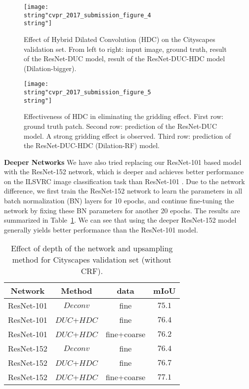 \documentclass[10pt,twocolumn,letterpaper]{article}
\begin{document}
\begin{figure*}[h]
\begin{center}
\texttt{[image: \\string"cvpr\_2017\_submission\_figure\_4\\string"]}
\end{center}
\caption{Effect of Hybrid Dilated Convolution (HDC) on the Cityscapes validation set. From left to right: input image, ground truth, result of the ResNet-DUC model, result of the ResNet-DUC-HDC model (Dilation-bigger).}
\label{cvpr_2017_submission_figure_4}
\vspace{-15pt}
\end{figure*}

\begin{figure}[h]
\begin{center}
\texttt{[image: \\string"cvpr\_2017\_submission\_figure\_5\\string"]}
\end{center}
\caption{Effectiveness of HDC in eliminating the gridding effect. First row: ground truth patch. Second row: prediction of the ResNet-DUC model. A strong gridding effect is observed. Third row: prediction of the ResNet-DUC-HDC (Dilation-RF) model.}
\label{Figure5_gridding_example_result}
\vspace{-10pt}
\end{figure}

\textbf{Deeper Networks}
We have also tried replacing our ResNet-101 based model with the ResNet-152 network, which is deeper and achieves better performance on the ILSVRC image classification task than ResNet-101 \cite{he2015deep}. Due to the network difference, we first train the ResNet-152 network to learn the parameters in all batch normalization (BN) layers for 10 epochs, and continue fine-tuning the network by fixing these BN parameters for another 20 epochs. The results are summarized in Table~\ref{table_3}. We can see that using the deeper ResNet-152 model generally yields better performance than the ResNet-101 model.
\begin{table}[ht]
\begin{center}
\begin{tabular}{ccc|c} \toprule[1.5pt]{Network}      &     {Method} & {data}  &{mIoU}\\ \midrule
   ResNet-101  &     $Deconv$  & {fine}  & $75.1$\\
   ResNet-101  &     $DUC$+$HDC$ & {fine}   & $76.4$\\
   ResNet-101  &     $DUC$+$HDC$  & {fine+coarse}  & $76.2$ \\\midrule
   ResNet-152  &     	 $Deconv$  & {fine}  & $76.4$ \\
   ResNet-152  &     	 $DUC$+$HDC$  & {fine}  & $76.7$\\
   ResNet-152  &     	 $DUC$+$HDC$  & {fine+coarse}  & $77.1$ \\
\bottomrule[1.5pt]
\end{tabular}
\vspace{2pt}
\caption{Effect of depth of the network and upsampling method for Cityscapes validation set (without CRF).}
\label{table_3}
\end{center}
\vspace{-25pt}
\end{table}
\end{document}
